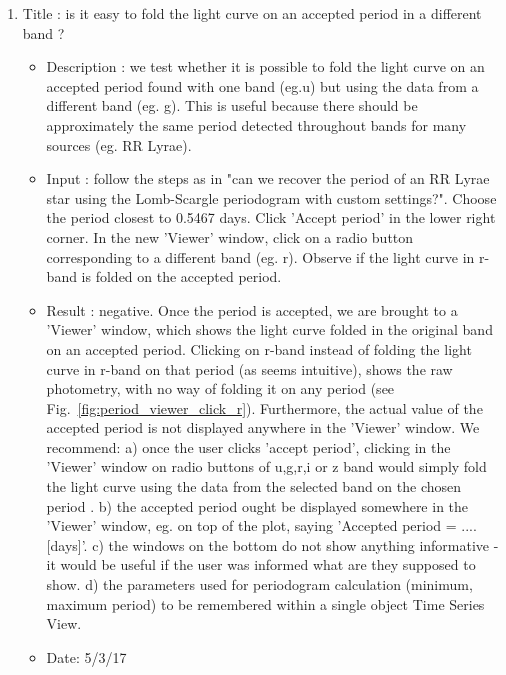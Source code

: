 \documentclass[DM,lsstdraft,toc,usenatbib]{lsstdoc}
\begin{document}
\begin{enumerate}
   \item Title : is it easy to fold the light curve on an accepted period in a different band ?
    \begin{itemize}
      \item Description : we test whether it is possible to fold the light curve on an accepted period found with one band (eg.u) but using the data from a different band (eg. g).  This is useful because there should be approximately the same period detected throughout bands for many sources (eg. RR Lyrae). 
      \item Input : follow the steps as in "can we recover the period of an RR Lyrae  star using the Lomb-Scargle periodogram with custom settings?".  Choose the period closest to 0.5467 days. Click 'Accept period' in the lower right corner.  In the new 'Viewer' window, click on a radio button corresponding to a different band (eg. r). Observe if the light curve in r-band is folded on the accepted period. 
      \item Result : negative.  Once the period is accepted, we are brought to a 'Viewer' window, which shows the light curve folded in the original band on an accepted period. Clicking on r-band instead of folding the light curve in r-band on that period (as seems intuitive), shows the raw photometry, with no way of folding it on any period (see Fig.~\ref{fig:period_viewer_click_r}).  Furthermore, the actual value of the accepted period is not displayed anywhere in the 'Viewer' window. We recommend:   
      a) once  the user clicks 'accept period', clicking in the 'Viewer' window on radio buttons of u,g,r,i or z  band would simply fold the light curve  using the data from the selected band on the chosen period .  
      b) the accepted period ought be displayed somewhere in the 'Viewer' window, eg. on top of the plot, saying 'Accepted period = .... [days]'. 
      c) the windows on the bottom do not show anything informative - it would be useful if the user was informed what are they supposed to show. 
      d) the parameters used for  periodogram calculation (minimum, maximum period) to be remembered within a single object Time Series View.
      \item Date: 5/3/17
    \end{itemize}


\end{enumerate}
\end{document}
